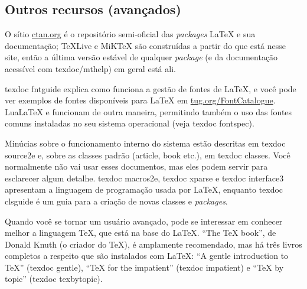 \subsection{Outros recursos (avançados)}

O sítio \url{ctan.org} é o repositório semi-oficial das
\textit{packages} \LaTeX{} e sua documentação; \TeX{}Live e MiK\TeX{} são
construídas a partir do que está nesse site, então a última versão estável de
qualquer \textit{package} (e da documentação acessível com \textsf{texdoc/mthelp})
em geral está ali.

\textsf{texdoc fntguide} explica como funciona a gestão de fontes de
\LaTeX{}, e você pode ver exemplos de fontes disponíveis para \LaTeX{}
em \url{tug.org/FontCatalogue}. Lua\LaTeX{} e \XeLaTeX{} funcionam de
outra maneira, permitindo também o uso das fontes comuns instaladas no
seu sistema operacional (veja \textsf{texdoc fontspec}).

Minúcias sobre o funcionamento interno do sistema estão descritas em
\textsf{texdoc source2e} e, sobre as classes padrão (\textsf{article, book}
etc.), em \textsf{texdoc classes}. Você normalmente não vai usar esses
documentos, mas eles podem servir para esclarecer algum detalhe.
\textsf{texdoc macros2e}, \textsf{texdoc xparse} e \textsf{texdoc
interface3} apresentam a linguagem de programação usada por \LaTeX{},
enquanto \textsf{texdoc clsguide} é um guia para a criação de novas
classes e \textit{packages}.

Quando você se tornar um usuário avançado, pode se interessar em conhecer
melhor a linguagem \TeX{}, que está na base do \LaTeX{}. ``The \TeX{} book'',
de Donald Knuth (o criador do \TeX), é amplamente recomendado, mas há três
livros completos a respeito que são instalados com \LaTeX{}: ``A gentle
introduction to \TeX{}'' (\textsf{texdoc gentle}), ``\TeX{} for the
impatient'' (\textsf{texdoc impatient}) e ``\TeX{} by topic'' (\textsf{texdoc
texbytopic}).
